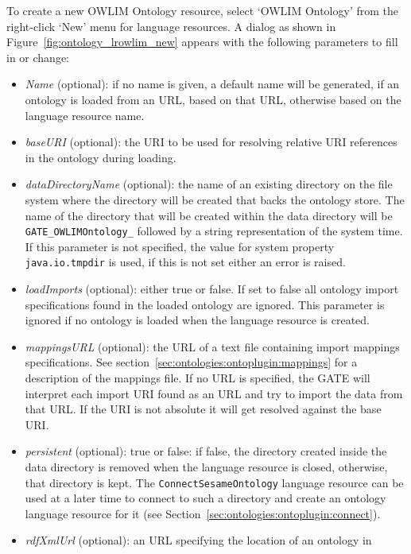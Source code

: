 To create a new OWLIM Ontology resource, select `OWLIM Ontology' from
the right-click `New' menu for language resources. A dialog as 
shown in Figure~\ref{fig:ontology_lrowlim_new} appears with the following 
parameters to fill in or change:
\begin{itemize}
 \item \emph{Name} (optional): if no name is given, a default name will be generated, if an
  ontology is loaded from an URL, based on that URL, otherwise based on
  the language resource name.
 \item \emph{baseURI} (optional): the URI to be used for resolving relative URI references 
    in the ontology during loading.
 \item \emph{dataDirectoryName} (optional): the name of an existing directory on the file 
   system where the directory will be created that backs the ontology store.
  The name of the directory that will be created within the data directory
  will be \verb!GATE_OWLIMOntology_! followed by a string representation
  of the system time. If this parameter is not specified, the value for 
  system property \texttt{java.io.tmpdir} is used, if this is not set either
  an error is raised.
 \item \emph{loadImports} (optional): either true or false. If set to false all ontology
 import specifications found in the loaded ontology are ignored. This
  parameter is ignored if no ontology is loaded when the language 
  resource is created. 
  \item \emph{mappingsURL} (optional): the URL of a text file containing import mappings 
  specifications. See section~\ref{sec:ontologies:ontoplugin:mappings} 
  for a description of the mappings file.
  If no URL is specified, the GATE will interpret each import URI found
  as an URL and try to import the data from that URL. If the URI is not absolute 
  it will get resolved against the base URI.
  \item \emph{persistent} (optional): true or false: if false, the directory created inside
  the data directory is removed when the language resource is closed, 
  otherwise, that directory is kept. The \verb!ConnectSesameOntology! language
  resource can be used at a later time to connect to such a directory and
  create an ontology language resource for it (see Section~\ref{sec:ontologies:ontoplugin:connect}).
  \item \emph{rdfXmlUrl} (optional): an URL specifying the location of an ontology in

\end{itemize}
